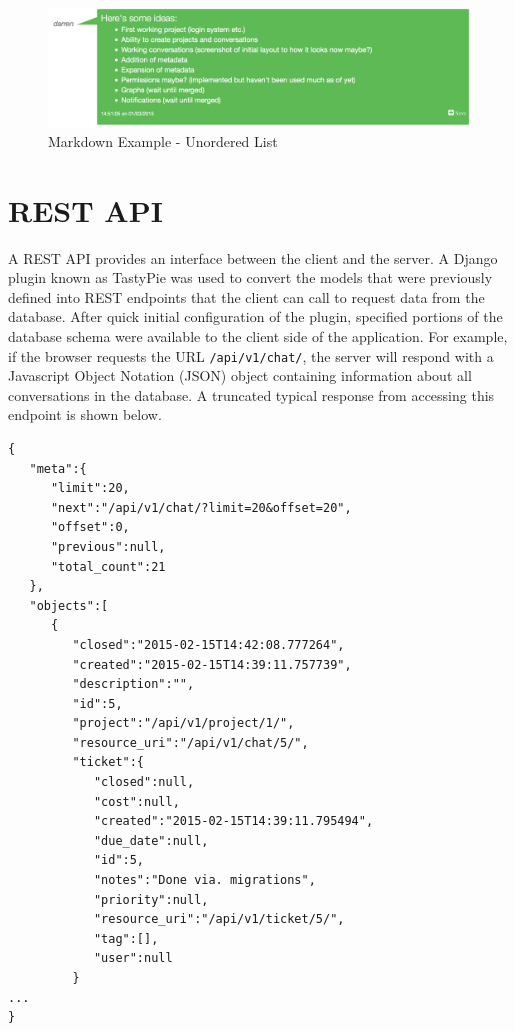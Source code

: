 \documentclass[a4paper]{l3proj}
\begin{document}
\begin{figure}[ht]
\centering
\includegraphics[scale=0.5]{markdownExample}
\caption{Markdown Example - Unordered List}
\label{figure:markdown}
\end{figure}

\section{REST API}
\label{restApi}


A REST API provides an interface between the client and the server. A Django plugin known as TastyPie \cite{site:tastypie} was used to convert the models that were previously defined into REST endpoints that the client can call to request data from the database. After quick initial configuration of the plugin, specified portions of the database schema were available to the client side of the application. For example, if the browser requests the URL \texttt{/api/v1/chat/}, the server will respond with a Javascript Object Notation (JSON) object containing information about all conversations in the database. A truncated typical response from accessing this endpoint is shown below.

\begin{verbatim}
{
   "meta":{
      "limit":20,
      "next":"/api/v1/chat/?limit=20&offset=20",
      "offset":0,
      "previous":null,
      "total_count":21
   },
   "objects":[
      {
         "closed":"2015-02-15T14:42:08.777264",
         "created":"2015-02-15T14:39:11.757739",
         "description":"",
         "id":5,
         "project":"/api/v1/project/1/",
         "resource_uri":"/api/v1/chat/5/",
         "ticket":{
            "closed":null,
            "cost":null,
            "created":"2015-02-15T14:39:11.795494",
            "due_date":null,
            "id":5,
            "notes":"Done via. migrations",
            "priority":null,
            "resource_uri":"/api/v1/ticket/5/",
            "tag":[],
            "user":null
         }
...
}
\end{verbatim}
\end{document}
